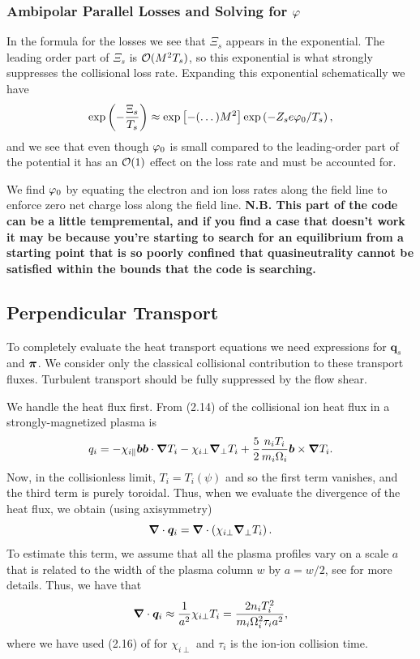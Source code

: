 \documentclass{revtex4-2}
\providecommand{\pitens}{\tensor{\pi}}
\begin{document}
\subsubsection{Ambipolar Parallel Losses and Solving for $\pot$}
In the formula  for the losses we see that $\Xi_s$ appears in the exponential. The leading order part of $\Xi_s$ is $\Or(M^2 T_s)$, so this exponential is what strongly suppresses the collisional loss rate. Expanding this exponential schematically we have
\begin{equation}
\exp\left( -\frac{\Xi_s}{T_s} \right) \approx \exp\left[ - (\dots) M^2 \right] \exp\left( -Z_s e \pot_0 / T_s \right),
\end{equation}
and we see that even though $\pot_0$ is small compared to the leading-order part of the potential it has an $\Or(1)$ effect on the loss rate and must be accounted for.

We find $\pot_0$ by equating the electron and ion loss rates along the field line to enforce zero net charge loss along the field line. \textbf{N.B. This part of the code can be a little tempremental, and if you find a case that doesn't work it may be because you're starting to search for an equilibrium from a starting point that is so poorly confined that quasineutrality cannot be satisfied within the bounds that the code is searching.}

\subsection{Perpendicular Transport}

To completely evaluate the heat transport equations we need expressions for $\bm{q}_s$ and $\pitens$. 
We consider only the classical collisional contribution to these transport fluxes. Turbulent transport should be fully suppressed by the flow shear.

We handle the heat flux first.
From (2.14) of \citet{braginskii1965tpp} the collisional ion heat flux in a strongly-magnetized plasma is 
\begin{equation}
q_i = -\chi_{i\parallel} \bm{b}\bm{b}\dg T_i - \chi_{i\perp} \grad_\perp T_i + \frac{5}{2} \frac{n_i T_i}{m_i \cycfreq[i]} \bm{b}\times\grad T_i.
\end{equation}
Now, in the collisionless limit, $T_i = T_i(\psi)$ and so the first term vanishes, and the third term is purely toroidal. Thus, when we evaluate the divergence of the heat flux, we obtain (using axisymmetry)
\begin{equation}
\dv\bm{q}_i = \dv\left( \chi_{i\perp} \grad_\perp T_i \right).
\end{equation}
To estimate this term, we assume that all the plasma profiles vary on a scale $a$ that is related to the width of the plasma column $w$ by $a = w/2$, see  for more details. Thus, we have that
\begin{equation}
\dv{\bm{q}_i} \approx \frac{1}{a^2} \chi_{i\perp} T_i = \frac{2 n_i T_i^2}{m_i \cycfreq[i]^2 \tau_i a^2},
\end{equation}
where we have used (2.16) of \citet{braginskii1965tpp} for $\chi_{i\perp}$ and $\tau_i$ is the ion-ion collision time.
\end{document}
